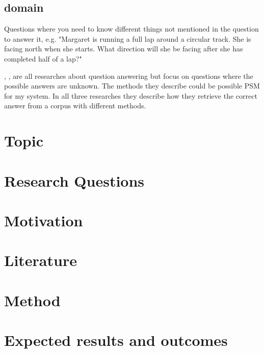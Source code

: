 \documentclass[11pt]{amsart}
\begin{document}
\subsection{domain}
Questions where you need to know different things not mentioned in the question to answer it, e.g. "Margaret is running a full lap around a circular track. She is facing north when she starts. What direction will she be facing after she has completed half of a lap?"

\vspace{5mm}
\cite{hixonlearning}, \cite{sukhbaatar2015end}, \cite{yu2014deep} are all researches about question answering but focus on questions where the possible answers are unknown.  The methods they describe could be possible PSM for my system. In all three researches they describe how they retrieve the correct answer from a corpus with different methods. 



\section{Topic}
\section{Research Questions}
\section{Motivation}
\section{Literature}
\section{Method}
\section{Expected results and outcomes}
 

\end{document}
